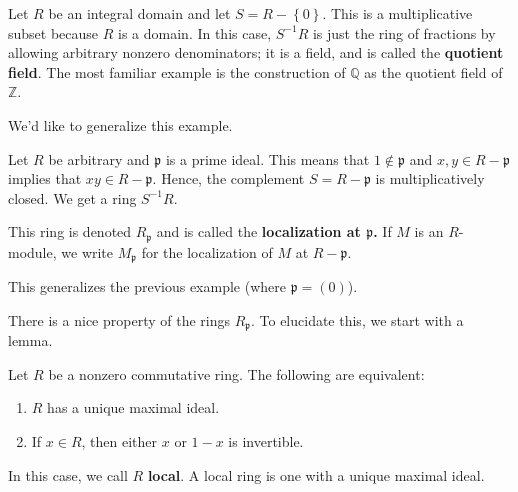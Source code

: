 \begin{example} 
Let $R$ be an integral domain and let $S = R - \left\{0\right\}$. This is a
multiplicative subset because $R$ is a domain.  In this case, $S^{-1}R$ is just
the ring of fractions by allowing arbitrary nonzero denominators; it is a
field, and is called the \textbf{quotient field}. The most familiar example is
the construction of $\mathbb{Q}$ as the quotient field of $\mathbb{Z}$.
\end{example} 

We'd like to generalize this example.  

\begin{example} 
Let $R$ be arbitrary and $\mathfrak{p}$ is a prime ideal.  This means that $1
\notin \mathfrak{p}$ and $x,y \in R - \mathfrak{p}$ implies that $xy \in R -
\mathfrak{p}$. Hence, the complement $S = R- \mathfrak{p}$  is multiplicatively
closed.  We get a ring $S^{-1}R$.

\begin{definition} 
This ring is denoted $R_{\mathfrak{p}}$ and is called the \textbf{localization
at $\mathfrak{p}$.} If $M$ is an $R$-module, we write $M_{\mathfrak{p}}$ for
the localization of $M$ at $R - \mathfrak{p}$.
\end{definition} 
This generalizes the previous example (where $\mathfrak{p} = (0)$).
\end{example} 

There is a nice property of the rings $R_{\mathfrak{p}}$. To elucidate this,
we start with a lemma.

\begin{lemma} 
Let $R$ be a nonzero commutative ring. The following are equivalent:
\begin{enumerate}
\item  $R$ has a unique maximal ideal.
\item If $x \in R$, then either $x$ or $1-x$ is invertible.
\end{enumerate}
\end{lemma} 

\begin{definition} 
In this case, we call $R$ \textbf{local}.  A local ring is one with a unique
maximal ideal.  
\end{definition} 

